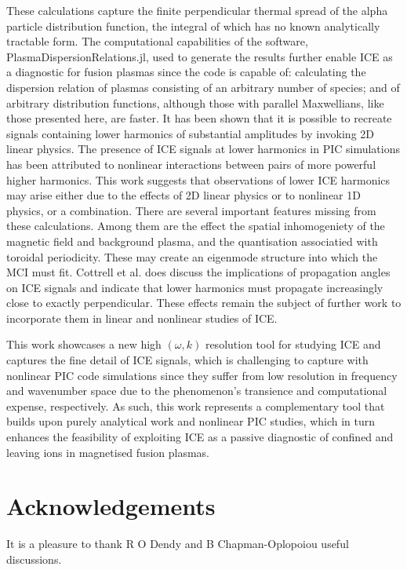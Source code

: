 \documentclass[12pt]{iopart}
\begin{document}
These calculations capture the finite perpendicular thermal spread of the alpha
particle distribution function, the integral of which has no known analytically
tractable form. The computational capabilities of the software,
PlasmaDispersionRelations.jl, used to generate the results further enable ICE as
a diagnostic for fusion plasmas since the code is capable of: calculating the
dispersion relation of plasmas consisting of an arbitrary number of species; and
of arbitrary distribution functions, although those with parallel Maxwellians,
like those presented here, are faster. It has been shown that it is possible to
recreate signals containing lower harmonics of substantial amplitudes by
invoking 2D linear physics. The presence of ICE signals at lower harmonics in
PIC simulations has been attributed to nonlinear interactions between pairs of
more powerful higher harmonics\cite{Carbajal2014}. This work suggests that
observations of lower ICE harmonics may arise either due to the effects of 2D
linear physics or to nonlinear 1D physics\cite{Chapman2018}, or a combination.
There are several important features missing from these calculations. Among them
are the effect the spatial inhomogeniety of the magnetic field and background
plasma, and the quantisation associatied with toroidal periodicity. These may
create an eigenmode structure into which the MCI must fit.
Cottrell et al. \cite{Cottrell1993} does discuss the implications of propagation angles on ICE signals and indicate that lower harmonics must propagate increasingly close to exactly perpendicular. These effects remain the subject of further work to incorporate them in linear and nonlinear studies of ICE.

This work showcases a new high $(\omega,k)$ resolution tool for studying ICE and captures the fine detail of ICE signals, which is challenging to capture with nonlinear PIC code simulations since they suffer from low resolution in frequency and wavenumber space due to the phenomenon's transience and computational expense, respectively. As such, this work represents a complementary tool that builds upon purely analytical work and nonlinear PIC studies, which in turn enhances the feasibility of exploiting ICE as a passive diagnostic of confined and leaving ions in magnetised fusion plasmas.

\section{Acknowledgements}

It is a pleasure to thank R O Dendy and B Chapman-Oplopoiou useful discussions.
\end{document}
